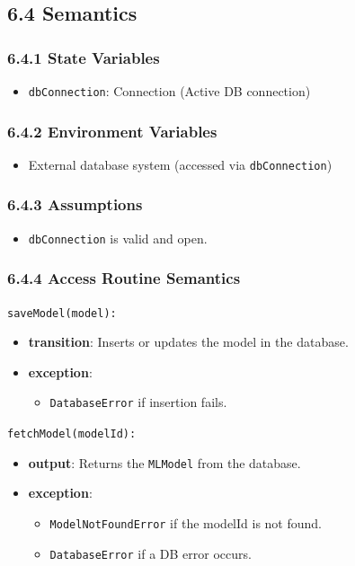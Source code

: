 \documentclass[12pt, titlepage]{article}
\begin{document}
\subsection{6.4 Semantics}

\subsubsection{6.4.1 State Variables}
\begin{itemize}
    \item \texttt{dbConnection}: Connection (Active DB connection)
\end{itemize}

\subsubsection{6.4.2 Environment Variables}
\begin{itemize}
    \item External database system (accessed via \texttt{dbConnection})
\end{itemize}

\subsubsection{6.4.3 Assumptions}
\begin{itemize}
    \item \texttt{dbConnection} is valid and open.
\end{itemize}

\subsubsection{6.4.4 Access Routine Semantics}
\noindent \texttt{saveModel(model):}
\begin{itemize}
    \item \textbf{transition}: Inserts or updates the model in the database.
    \item \textbf{exception}:
    \begin{itemize}
        \item \texttt{DatabaseError} if insertion fails.
    \end{itemize}
\end{itemize}

\noindent \texttt{fetchModel(modelId):}
\begin{itemize}
    \item \textbf{output}: Returns the \texttt{MLModel} from the database.
    \item \textbf{exception}:
    \begin{itemize}
        \item \texttt{ModelNotFoundError} if the modelId is not found.
        \item \texttt{DatabaseError} if a DB error occurs.
    \end{itemize}
\end{itemize}
\end{document}
